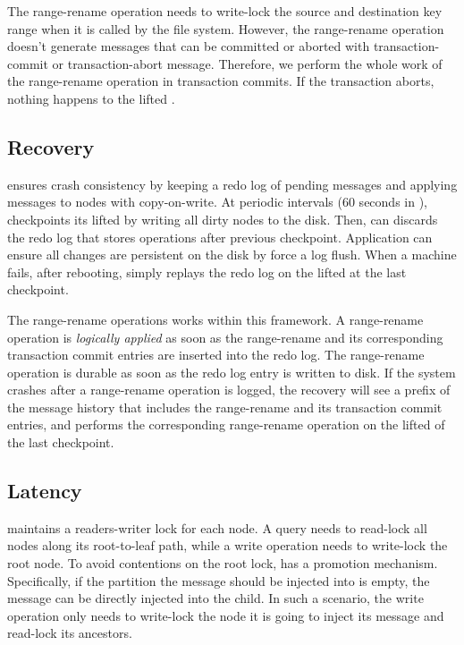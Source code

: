 The range-rename operation needs to write-lock the source and
destination key range when it is called by the file system.
However, the range-rename operation doesn't generate messages that can
be committed or aborted with transaction-commit or transaction-abort message.
Therefore, we perform the whole work of the range-rename operation in
transaction commits.
If the transaction aborts, nothing happens to the lifted \bet.

\subsection{Recovery}

\Fti ensures crash consistency by keeping a redo log of pending messages and
applying messages to \betrfs nodes with copy-on-write.
At periodic intervals (60 seconds in \betrfs), \fti checkpoints its lifted
\bets by writing all dirty nodes to the disk.
Then, \fti can discards the redo log that stores operations after previous
checkpoint.
Application can ensure all changes are persistent on the disk by force a log
flush.
When a machine fails, after rebooting, \fti simply replays the redo log on the
lifted \bets at the last checkpoint.

The range-rename operations works within this framework.
A range-rename operation is {\em logically applied} as soon as the
range-rename and its corresponding transaction commit entries are inserted into
the redo log.
The range-rename operation is durable as soon as the redo log entry is written
to disk.
If the system crashes after a range-rename operation is logged, the recovery
will see a prefix of the message history that includes the range-rename
and its transaction commit entries,
and performs the corresponding range-rename operation on the lifted \bets of the
last checkpoint.

\subsection{Latency}

\Fti maintains a readers-writer lock for each \bet node.
A query needs to read-lock all nodes along its root-to-leaf path, while a
write operation needs to write-lock the root node.
To avoid contentions on the root lock, \fti has a promotion mechanism.
Specifically, if the partition the message should be injected into is empty,
the message can be directly injected into the child.
In such a scenario, the write operation only needs to write-lock the node it is
going to inject its message and read-lock its ancestors.

